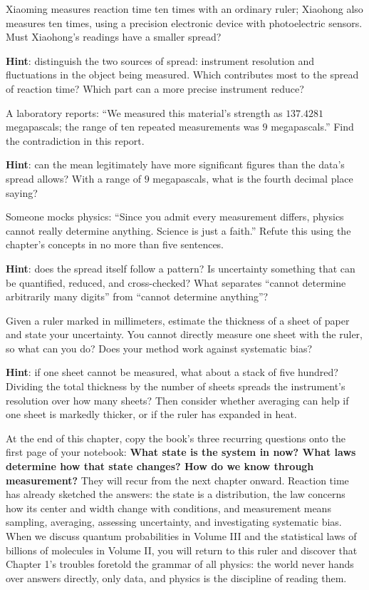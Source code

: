 \begin{puzzles}
\item Xiaoming measures reaction time ten times with an ordinary ruler; Xiaohong also measures ten times, using a precision electronic device with photoelectric sensors. Must Xiaohong's readings have a smaller spread?

\textbf{Hint}: distinguish the two sources of spread: instrument resolution and fluctuations in the object being measured. Which contributes most to the spread of reaction time? Which part can a more precise instrument reduce?
\item A laboratory reports: ``We measured this material's strength as \(137.4281\) megapascals; the range of ten repeated measurements was \(9\) megapascals.'' Find the contradiction in this report.

\textbf{Hint}: can the mean legitimately have more significant figures than the data's spread allows? With a range of \(9\) megapascals, what is the fourth decimal place saying?
\item Someone mocks physics: ``Since you admit every measurement differs, physics cannot really determine anything. Science is just a faith.'' Refute this using the chapter's concepts in no more than five sentences.

\textbf{Hint}: does the spread itself follow a pattern? Is uncertainty something that can be quantified, reduced, and cross-checked? What separates ``cannot determine arbitrarily many digits'' from ``cannot determine anything''?
\item Given a ruler marked in millimeters, estimate the thickness of a sheet of paper and state your uncertainty. You cannot directly measure one sheet with the ruler, so what can you do? Does your method work against systematic bias?

\textbf{Hint}: if one sheet cannot be measured, what about a stack of five hundred? Dividing the total thickness by the number of sheets spreads the instrument's resolution over how many sheets? Then consider whether averaging can help if one sheet is markedly thicker, or if the ruler has expanded in heat.
\end{puzzles}

At the end of this chapter, copy the book's three recurring questions onto the first page of your notebook: \textbf{What state is the system in now? What laws determine how that state changes? How do we know through measurement?} They will recur from the next chapter onward. Reaction time has already sketched the answers: the state is a distribution, the law concerns how its center and width change with conditions, and measurement means sampling, averaging, assessing uncertainty, and investigating systematic bias. When we discuss quantum probabilities in Volume III and the statistical laws of billions of molecules in Volume II, you will return to this ruler and discover that Chapter 1's troubles foretold the grammar of all physics: the world never hands over answers directly, only data, and physics is the discipline of reading them.
